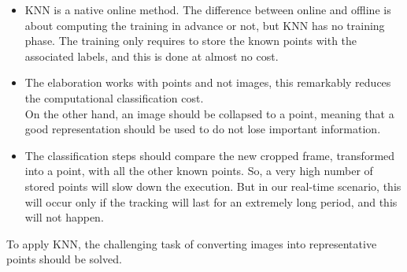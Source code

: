 \begin{itemize}
	\item KNN is a native online method. The difference between online and offline is about computing the training in advance or not, but KNN has no training phase. The training only requires to store the known points with the associated labels, and this is done at almost no cost.
	\item The elaboration works with points and not images, this remarkably reduces the computational classification cost.\\
	On the other hand, an image should be collapsed to a point, meaning that a good representation should be used to do not lose important information.
	\item The classification steps should compare the new cropped frame, transformed into a point, with all the other known points. So, a very high number of stored points will slow down the execution. But in our real-time scenario, this will occur only if the tracking will last for an extremely long period, and this will not happen.
\end{itemize}
To apply KNN, the challenging task of converting images into representative points should be solved.
